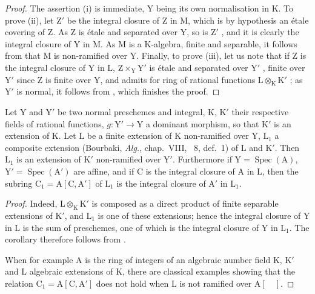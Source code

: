 \begin{proof}
The assertion (i) is immediate, $\mathrm{Y}$ being its own normalisation in $\mathrm{K}$.
To prove (ii), let $\mathrm{Z}'$ be the integral closure of $\mathrm{Z}$ in $\mathrm{M}$, which is by hypothesis an \'etale covering of $\mathrm{Z}$.
As $\mathrm{Z}$ is \'etale and separated over $\mathrm{Y}$, so is $\mathrm{Z}'$ , and it is clearly the integral closure of $\mathrm{Y}$ in $\mathrm{M}$.
As $\mathrm{M}$ is a $\mathrm{K}$-algebra, finite and separable, it follows from  that $\mathrm{M}$ is non-ramified over $\mathrm{Y}$.
Finally, to prove (iii), let us note that if $\mathrm{Z}$ is the integral closure of $\mathrm{Y}$ in $\mathrm{L}$, $\mathrm{Z}\times_{\mathrm{Y}}\mathrm{Y}'$ is \'etale and separated over $\mathrm{Y}'$ , finite over $\mathrm{Y}'$ since $\mathrm{Z}$ is finite over $\mathrm{Y}$, and admits for ring of rational functions $\mathrm{L}\otimes_{\mathrm{K}}\mathrm{K}'$ ; as $\mathrm{Y}'$ is normal, it follows from , which finishes the proof.
\end{proof}

\begin{corollary}[18.10.14]
\label{IV.18.10.14}
Let $\mathrm{Y}$ and $\mathrm{Y}'$ be two normal preschemes and integral, $\mathrm{K}$, $\mathrm{K}'$ their respective fields of rational functions, $g:\mathrm{Y}'\to\mathrm{Y}$ a dominant morphism, so that $\mathrm{K}'$ is an extension of $\mathrm{K}$.
Let $\mathrm{L}$ be a finite extension of $\mathrm{K}$ non-ramified over $\mathrm{Y}$, $\mathrm{L}_1$ a composite extension (Bourbaki, \emph{Alg.}, chap.~VIII, \textsection~8, def.~1) of $\mathrm{L}$ and $\mathrm{K}'$.
Then $\mathrm{L}_1$ is an extension of $\mathrm{K}'$ non-ramified over $\mathrm{Y}'$.
Furthermore if $\mathrm{Y}=\operatorname{Spec}(\mathrm{A})$, $\mathrm{Y}'=\operatorname{Spec}(\mathrm{A}')$ are affine, and if $\mathrm{C}$ is the integral closure of $\mathrm{A}$ in $\mathrm{L}$, then the subring $\mathrm{C}_1=\mathrm{A}[\mathrm{C},\mathrm{A}']$ of $\mathrm{L}_1$ is the integral closure of $\mathrm{A}'$ in $\mathrm{L}_1$.
\end{corollary}

\begin{proof}
Indeed, $\mathrm{L}\otimes_{\mathrm{K}}\mathrm{K}'$ is composed as a direct product of finite separable extensions of $\mathrm{K}'$, and $\mathrm{L}_1$ is one of these extensions; hence the integral closure of $\mathrm{Y}$ in $\mathrm{L}$ is the sum of preschemes, one of which is the integral closure of $\mathrm{Y}$ in $\mathrm{L}_1$.
The corollary therefore follows from .

When for example $\mathrm{A}$ is the ring of integers of an algebraic number field $\mathrm{K}$, $\mathrm{K}'$ and $\mathrm{L}$ algebraic extensions of $\mathrm{K}$, there are classical examples showing that the relation $\mathrm{C}_1=\mathrm{A}[\mathrm{C},\mathrm{A}']$ does not hold when $\mathrm{L}$ is not ramified over $\mathrm{A}[\quad]$.
\end{proof}

